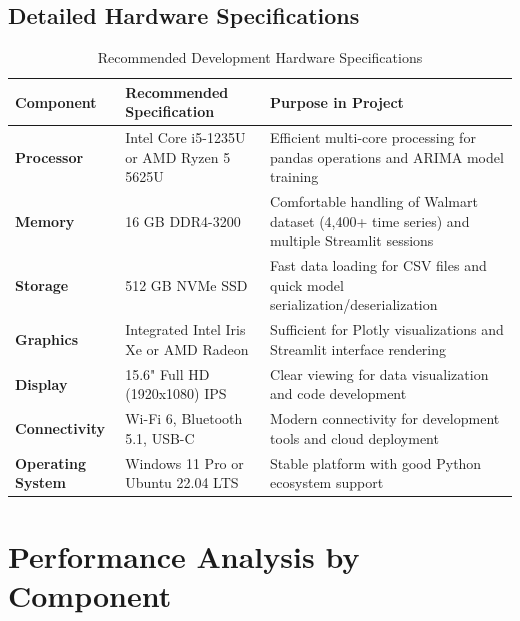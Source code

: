 \subsection*{Detailed Hardware Specifications}

\begin{table}[H]
	\centering
	\caption{Recommended Development Hardware Specifications}
	\begin{tabular}{|p{3cm}|p{5cm}|p{5cm}|}
		\hline
		\textbf{Component} & \textbf{Recommended Specification} & \textbf{Purpose in Project} \\
		\hline
		\textbf{Processor} & Intel Core i5-1235U or AMD Ryzen 5 5625U & Efficient multi-core processing for pandas operations and ARIMA model training \\
		\hline
		\textbf{Memory} & 16 GB DDR4-3200 & Comfortable handling of Walmart dataset (4,400+ time series) and multiple Streamlit sessions \\
		\hline
		\textbf{Storage} & 512 GB NVMe SSD & Fast data loading for CSV files and quick model serialization/deserialization \\
		\hline
		\textbf{Graphics} & Integrated Intel Iris Xe or AMD Radeon & Sufficient for Plotly visualizations and Streamlit interface rendering \\
		\hline
		\textbf{Display} & 15.6" Full HD (1920x1080) IPS & Clear viewing for data visualization and code development \\
		\hline
		\textbf{Connectivity} & Wi-Fi 6, Bluetooth 5.1, USB-C & Modern connectivity for development tools and cloud deployment \\
		\hline
		\textbf{Operating System} & Windows 11 Pro or Ubuntu 22.04 LTS & Stable platform with good Python ecosystem support \\
		\hline
	\end{tabular}
	\label{tab:recommended-specs}
\end{table}

\section*{Performance Analysis by Component}

